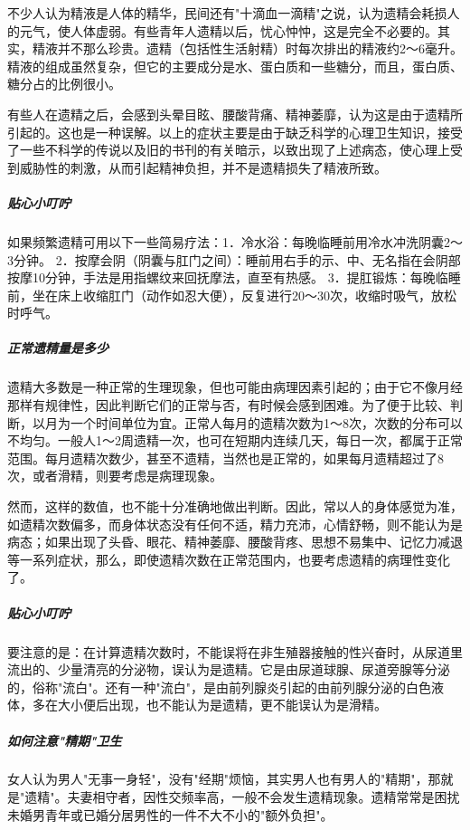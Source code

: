 不少人认为精液是人体的精华，民间还有"十滴血一滴精"之说，认为遗精会耗损人的元气，使人体虚弱。有些青年人遗精以后，忧心忡忡，这是完全不必要的。其实，精液并不那么珍贵。遗精（包括性生活射精）时每次排出的精液约2～6毫升。精液的组成虽然复杂，但它的主要成分是水、蛋白质和一些糖分，而且，蛋白质、糖分占的比例很小。

有些人在遗精之后，会感到头晕目眩、腰酸背痛、精神萎靡，认为这是由于遗精所引起的。这也是一种误解。以上的症状主要是由于缺乏科学的心理卫生知识，接受了一些不科学的传说以及旧的书刊的有关暗示，以致出现了上述病态，使心理上受到威胁性的刺激，从而引起精神负担，并不是遗精损失了精液所致。

\subparagraph{贴心小叮咛}

如果频繁遗精可用以下一些简易疗法：1．冷水浴：每晚临睡前用冷水冲洗阴囊2～3分钟。
2．按摩会阴（阴囊与肛门之间）：睡前用右手的示、中、无名指在会阴部按摩10分钟，手法是用指螺纹来回抚摩法，直至有热感。
3．提肛锻炼：每晚临睡前，坐在床上收缩肛门（动作如忍大便），反复进行20～30次，收缩时吸气，放松时呼气。

\subparagraph{正常遗精量是多少}

遗精大多数是一种正常的生理现象，但也可能由病理因素引起的；由于它不像月经那样有规律性，因此判断它们的正常与否，有时候会感到困难。为了便于比较、判断，以月为一个时间单位为宜。正常人每月的遗精次数为1～8次，次数的分布可以不均匀。一般人1～2周遗精一次，也可在短期内连续几天，每日一次，都属于正常范围。每月遗精次数少，甚至不遗精，当然也是正常的，如果每月遗精超过了8次，或者滑精，则要考虑是病理现象。

然而，这样的数值，也不能十分准确地做出判断。因此，常以人的身体感觉为准，如遗精次数偏多，而身体状态没有任何不适，精力充沛，心情舒畅，则不能认为是病态；如果出现了头昏、眼花、精神萎靡、腰酸背疼、思想不易集中、记忆力减退等一系列症状，那么，即使遗精次数在正常范围内，也要考虑遗精的病理性变化了。

\subparagraph{贴心小叮咛}

要注意的是：在计算遗精次数时，不能误将在非生殖器接触的性兴奋时，从尿道里流出的、少量清亮的分泌物，误认为是遗精。它是由尿道球腺、尿道旁腺等分泌的，俗称"流白"。还有一种"流白"，是由前列腺炎引起的由前列腺分泌的白色液体，多在大小便后出现，也不能认为是遗精，更不能误认为是滑精。

\subparagraph{如何注意"精期"卫生}

女人认为男人"无事一身轻"，没有"经期"烦恼，其实男人也有男人的"精期"，那就是"遗精"。夫妻相守者，因性交频率高，一般不会发生遗精现象。遗精常常是困扰未婚男青年或已婚分居男性的一件不大不小的"额外负担"。


